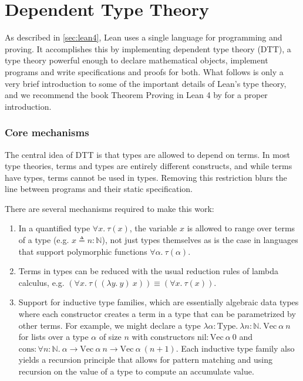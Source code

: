 \section{Dependent Type Theory}\label{sec:dtt}
As described in \cref{sec:lean4}, Lean uses a single language for programming and proving. It accomplishes this by implementing dependent type theory (DTT), a type theory powerful enough to declare mathematical objects, implement programs and write specifications and proofs for both. What follows is only a very brief introduction to some of the important details of Lean's type theory, and we recommend the book Theorem Proving in Lean 4 by \cite{avigad_theorem_2022} for a proper introduction.

\subsubsection{Core mechanisms}
The central idea of DTT is that types are allowed to depend on terms. In most type theories, terms and types are entirely different constructs, and while terms have types, terms cannot be used in types. Removing this restriction blurs the line between programs and their static specification.

There are several mechanisms required to make this work: 
\begin{enumerate}
	\item In a quantified type $\forall x.\ \tau(x)$, the variable $x$ is allowed to range over terms of a type (e.g. $x \triangleq n : \mathbb{N}$), not just types themselves as is the case in languages that support polymorphic functions $\forall \alpha.\ \tau(\alpha)$.
	\item Terms in types can be reduced with the usual reduction rules of lambda calculus, e.g. $(\forall x.\ \tau((\lambda y.\ y)\ x)) \equiv (\forall x.\ \tau(x))$.
	\item Support for inductive type families, which are essentially algebraic data types where each constructor creates a term in a type that can be parametrized by other terms. For example, we might declare a type $\lambda \alpha : \mathrm{Type}.\ \lambda n : \mathbb{N}.\ \mathrm{Vec}\ \alpha\ n$ for lists over a type $\alpha$ of size $n$ with constructors $\mathrm{nil} : \mathrm{Vec}\ \alpha\ 0$ and $\mathrm{cons} : \forall n : \mathbb{N}.\ \alpha \to \mathrm{Vec}\ \alpha\ n \to \mathrm{Vec}\ \alpha\ (n+1)$. Each inductive type family also yields a recursion principle that allows for pattern matching and using recursion on the value of a type to compute an accumulate value.
\end{enumerate}

